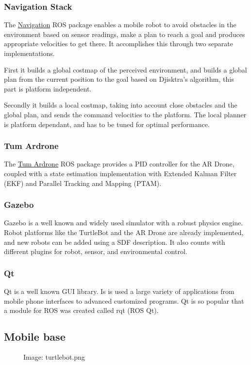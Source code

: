 \documentclass[11pt,a4paper]{article}
\newcommand{\centerImage}[1]{
	\begin{figure}[h]
	\centering
	Image: #1
	\end{figure}
}
\begin{document}
\subsubsection{Navigation Stack}
The \href{http://wiki.ros.org/navigation}{Navigation} ROS package enables a mobile robot to avoid obstacles in the environment based on sensor readings, make a plan to reach a goal and produces appropriate velocities to get there. It accomplishes this through two separate implementations. 

First it builds a global costmap of the perceived environment, and builds a global plan from the current position to the goal based on Djisktra's algorithm, this part is platform independent. 

Secondly it builds a local costmap, taking into account close obstacles and the global plan, and sends the command velocities to the platform. The local planner is  platform dependant, and has to be tuned for optimal performance.

\subsubsection{Tum Ardrone}
The \href{http://wiki.ros.org/tum_ardrone}{Tum Ardrone} ROS package provides a PID controller for the AR Drone, coupled with a state estimation implementation with Extended Kalman Filter (EKF) and Parallel Tracking and Mapping (PTAM).

\subsubsection{Gazebo}
Gazebo is a well known and widely used simulator with a robust physics engine. 
Robot platforms like the TurtleBot and the AR Drone are already implemented, and new robots can be added using a SDF description. It also counts with different plugins  for robot, sensor, and environmental control. 

\subsubsection{Qt}
Qt is a well known GUI library. Is is used a large variety of applications from mobile phone interfaces to advanced customized programs. Qt is so popular that a module for ROS was
created called rqt (ROS Qt).


\subsection{Mobile base}
\centerImage{turtlebot.png}
\end{document}
